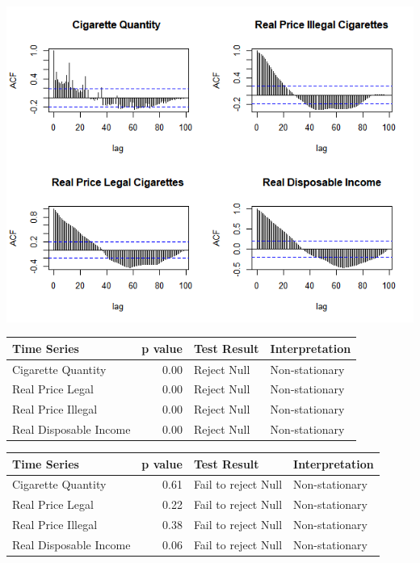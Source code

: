 \documentclass[11pt,preprint, authoryear]{elsarticle}
\let\origfigure\figure
\let\endorigfigure\endfigure
\renewenvironment{figure}[1][2] {
    \expandafter\origfigure\expandafter[H]
} {
    \endorigfigure
}
\let\origtable\table
\let\endorigtable\endtable
\renewenvironment{table}[1][2] {
    \expandafter\origtable\expandafter[H]
} {
    \endorigtable
}
\numberwithin{equation}{section}
\numberwithin{figure}{section}
\numberwithin{table}{section}
\begin{document}
\begin{figure}
\centering
\includegraphics{img/ACF.png}
\caption{\label{plot2} ACF Plots}
\end{figure}

\begin{table}[H]
\centering
\begin{tabular}{lrll}
  \hline
Time Series & p value & Test Result & Interpretation \\ 
  \hline
Cigarette Quantity & 0.00 & Reject Null & Non-stationary \\ 
  Real Price Legal & 0.00 & Reject Null & Non-stationary \\ 
  Real Price Illegal & 0.00 & Reject Null & Non-stationary \\ 
  Real Disposable Income & 0.00 & Reject Null & Non-stationary \\ 
   \hline
\end{tabular}
\caption{Ljung-Box Test \label{box}} 
\end{table}

\begin{table}[H]
\centering
\begin{tabular}{lrll}
  \hline
Time Series & p value & Test Result & Interpretation \\ 
  \hline
Cigarette Quantity & 0.61 & Fail to reject Null & Non-stationary \\ 
  Real Price Legal & 0.22 & Fail to reject Null & Non-stationary \\ 
  Real Price Illegal & 0.38 & Fail to reject Null & Non-stationary \\ 
  Real Disposable Income & 0.06 & Fail to reject Null & Non-stationary \\ 
   \hline
\end{tabular}
\caption{Augmented Dickey-Fuller Test \label{adf}} 
\end{table}
\end{document}
